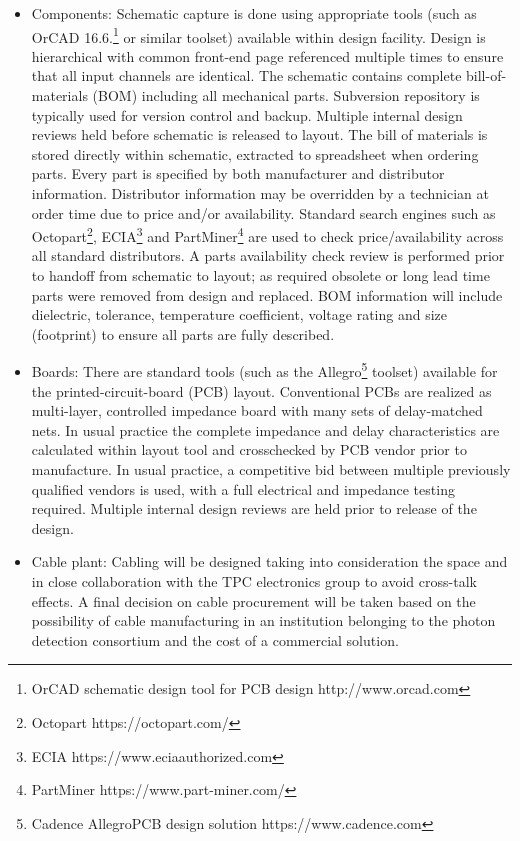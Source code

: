 \begin{itemize}

\item Components: Schematic capture is done using appropriate tools (such as OrCAD 16.6.\footnote{OrCAD\texttrademark{} schematic design tool for PCB design http://www.orcad.com} or similar toolset) available within design facility. Design is hierarchical with common front-end page referenced multiple times to ensure that all input channels are identical. The schematic contains complete bill-of-materials (BOM) including all mechanical parts. Subversion repository is typically used for version control and backup. Multiple internal design reviews held before schematic is released to layout. The bill of materials is stored directly within schematic, extracted to spreadsheet when ordering parts. Every part is specified by both manufacturer and distributor information. Distributor information may be overridden by a technician at order time due to price and/or availability. Standard search engines such as Octopart\footnote{Octopart https://octopart.com/}, ECIA\footnote{ ECIA https://www.eciaauthorized.com} and PartMiner\footnote{PartMiner https://www.part-miner.com/} are used to check price/availability across all standard distributors. A parts availability check review is performed prior to handoff from schematic to layout; as required obsolete or long lead time parts were removed from design and replaced. BOM information will include dielectric, tolerance, temperature coefficient, voltage rating and size (footprint) to ensure all parts are fully described.

\item Boards: There are standard tools (such as the Allegro\footnote{Cadence Allegro\textregistered PCB design solution https://www.cadence.com} toolset) available for the printed-circuit-board (PCB) layout. Conventional PCBs are realized as multi-layer, controlled impedance board with many sets of delay-matched nets. In usual practice the complete impedance and delay characteristics are calculated within layout tool and crosschecked by PCB vendor prior to manufacture. In usual practice, a competitive bid between multiple previously qualified vendors is used, with a full electrical and impedance testing required. Multiple internal design reviews are held prior to release of the design.

\item Cable plant: Cabling will be designed taking into consideration the  space and in close collaboration with the TPC electronics group to avoid cross-talk effects. A final decision on cable procurement will be taken based on the possibility of cable manufacturing in an institution belonging to the photon detection consortium and the cost of a commercial solution.  


\end{itemize}
